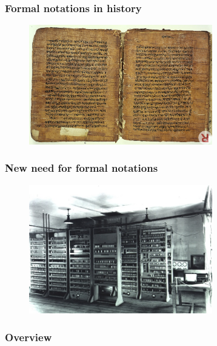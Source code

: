 \documentclass{beamer}
\begin{document}
\begin{frame}
	\frametitle{Formal notations in history}
	
	\begin{figure}
		\includegraphics[width=8cm]{1920px-Birch_bark_MS_from_Kashmir_of_the_Rupavatra_Wellcome_L0032691}
		\caption{\cite{birch}}
		\label{fig:bark}
	\end{figure}
\end{frame}

\begin{frame}
	\frametitle{New need for formal notations}
	
	\begin{figure}
		\includegraphics[width=8cm]{EDSAC_(19)}
		\caption{\cite{EDSAC}}
	\end{figure}
\end{frame}

\begin{frame}
\frametitle{Overview} %
\tableofcontents %
\end{frame}
\end{document}
